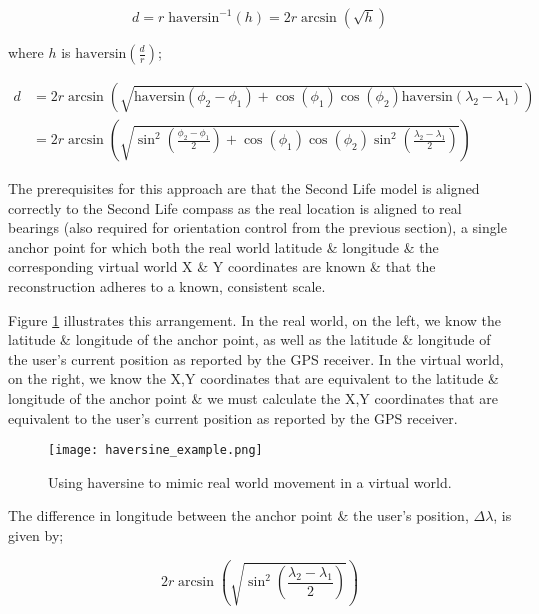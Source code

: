 \begin{equation}
	\label{haversine3}
	d = r\;\text{haversin}^{-1}\left( h \right) = 2r \arcsin \left( \sqrt{h} \right)
\end{equation}

where $h$ is $\text{haversin}\left( \frac{d}{r} \right)$;

\begin{align}
d & = 2r \arcsin\left( \sqrt{\text{haversin} \left( \phi_{2} - \phi_{1} \right) + \cos \left( \phi_{1} \right) \cos  \left( \phi_{2} \right) \text{haversin} \left( \lambda_{2} - \lambda_{1} \right) } \right) \nonumber \\ 
& = 2r \arcsin\left( \sqrt{\sin^{2} \left( \frac{\phi_{2} - \phi_{1}}{2}\right) + \cos\left( \phi_{1} \right) \cos\left( \phi_{2} \right) \sin^{2} \left( \frac{\lambda_{2} - \lambda_{1}}{2} \right) } \right)
\end{align}

The prerequisites for this approach are that the Second Life model is aligned correctly to the Second Life compass as the real location is aligned to real bearings (also required for orientation control from the previous section), a single anchor point for which both the real world latitude \& longitude \& the corresponding virtual world X \& Y coordinates are known \& that the reconstruction adheres to a known, consistent scale.

Figure \ref{haversine_example.png} illustrates this arrangement. In the real world, on the left, we know the latitude \& longitude of the anchor point, as well as the latitude \& longitude of the user's current position as reported by the GPS receiver. In the virtual world, on the right, we know the X,Y coordinates that are equivalent to the latitude \& longitude of the anchor point \& we must calculate the X,Y coordinates that are equivalent to the user's current position as reported by the GPS receiver.

\begin{figure}[h]
\centering
  \texttt{[image: haversine\_example.png]}
  \caption{Using haversine to mimic real world movement in a virtual world.}
  \label{haversine_example.png}
\end{figure}

The difference in longitude between the anchor point \& the user's position, $\Delta\lambda$, is given by;

\begin{equation}
2r \arcsin\left( \sqrt{\sin^{2} \left( \frac{\lambda_{2} - \lambda_{1}}{2} \right) } \right)
\end{equation}


